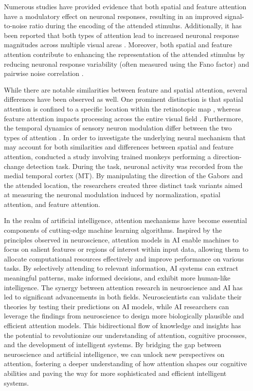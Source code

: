 Numerous studies have provided evidence that both spatial and feature attention have a modulatory effect on neuronal responses, resulting in an improved signal-to-noise ratio during the encoding of the attended stimulus. Additionally, it has been reported that both types of attention lead to increased neuronal response magnitudes across multiple visual areas \citep{carrasco2011visual}. Moreover, both spatial and feature attention contribute to enhancing the representation of the attended stimulus by reducing neuronal response variability (often measured using the Fano factor) and pairwise noise correlation \citep{cohen2009attention,mitchell2009spatial}. 

While there are notable similarities between feature and spatial attention, several differences have been observed as well. One prominent distinction is that spatial attention is confined to a specific location within the retinotopic map \citep{womelsdorf2006dynamic}, whereas feature attention impacts processing across the entire visual field \citep{saenz2002global}. Furthermore, the temporal dynamics of sensory neuron modulation differ between the two types of attention \citep{hayden2005time}. In order to investigate the underlying neural mechanism that may account for both similarities and differences between spatial and feature attention, \citet{ni2019neuronal} conducted a study involving trained monkeys performing a direction-change detection task. During the task, neuronal activity was recorded from the medial temporal cortex (MT). By manipulating the direction of the Gabors and the attended location, the researchers created three distinct task variants aimed at measuring the neuronal modulation induced by normalization, spatial attention, and feature attention.

In the realm of artificial intelligence, attention mechanisms have become essential components of cutting-edge machine learning algorithms. Inspired by the principles observed in neuroscience, attention models in AI enable machines to focus on salient features or regions of interest within input data, allowing them to allocate computational resources effectively and improve performance on various tasks. By selectively attending to relevant information, AI systems can extract meaningful patterns, make informed decisions, and exhibit more human-like intelligence. The synergy between attention research in neuroscience and AI has led to significant advancements in both fields. Neuroscientists can validate their theories by testing their predictions on AI models, while AI researchers can leverage the findings from neuroscience to design more biologically plausible and efficient attention models. This bidirectional flow of knowledge and insights has the potential to revolutionize our understanding of attention, cognitive processes, and the development of intelligent systems. By bridging the gap between neuroscience and artificial intelligence, we can unlock new perspectives on attention, fostering a deeper understanding of how attention shapes our cognitive abilities and paving the way for more sophisticated and efficient intelligent systems. 



